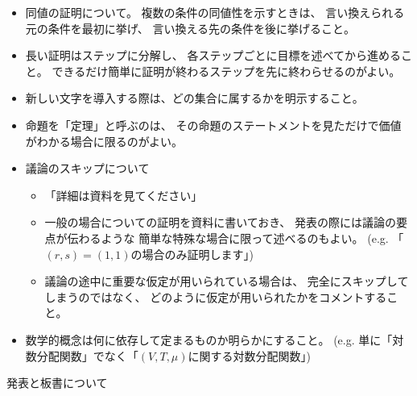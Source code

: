 \documentclass[report, notitlepage]{jlreq}
\begin{document}
\begin{itemize}
    \item 同値の証明について。
        複数の条件の同値性を示すときは、
        言い換えられる元の条件を最初に挙げ、
        言い換える先の条件を後に挙げること。
    \item 長い証明はステップに分解し、
        各ステップごとに目標を述べてから進めること。
        できるだけ簡単に証明が終わるステップを先に終わらせるのがよい。
    \item 新しい文字を導入する際は、どの集合に属するかを明示すること。
    \item 命題を「定理」と呼ぶのは、
        その命題のステートメントを見ただけで価値がわかる場合に限るのがよい。
    \item 議論のスキップについて
        \begin{itemize}
            \item 「詳細は資料を見てください」
            \item 一般の場合についての証明を資料に書いておき、
                発表の際には議論の要点が伝わるような
                簡単な特殊な場合に限って述べるのもよい。
                (e.g. 「$(r, s) = (1, 1)$の場合のみ証明します」)
            \item 議論の途中に重要な仮定が用いられている場合は、
                完全にスキップしてしまうのではなく、
                どのように仮定が用いられたかをコメントすること。
        \end{itemize}
    \item 数学的概念は何に依存して定まるものか明らかにすること。
        (e.g. 単に「対数分配関数」でなく「$(V, T, \mu)$に関する対数分配関数」)
\end{itemize}

発表と板書について
\end{document}
